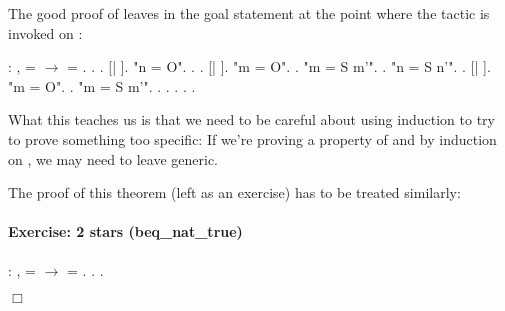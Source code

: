 \documentclass[12pt]{report}
\begin{document}
 The good proof of  leaves  in the goal
    statement at the point where the  tactic is invoked on
    : \begin{coqdoccode}
\coqdocemptyline
\coqdocnoindent
{}  : \coqdockw{\ensuremath{\forall}}  ,\coqdoceol
\coqdocindent{2.50em}
  =   \ensuremath{\rightarrow}\coqdoceol
\coqdocindent{2.50em}
 = .\coqdoceol
\coqdocnoindent
{}.\coqdoceol
\coqdocindent{1.00em}
 .    [| ].\coqdoceol
\coqdocindent{1.00em}
 "n = O". .   .    [| ].\coqdoceol
\coqdocindent{2.00em}
 "m = O". .\coqdoceol
\coqdocindent{2.00em}
 "m = S m'".  .\coqdoceol
\coqdocindent{1.00em}
 "n = S n'".\coqdoceol
\coqdocindent{2.00em}
  .\coqdoceol
\coqdocindent{2.00em}
   [| ].\coqdoceol
\coqdocindent{2.00em}
 "m = O".\coqdoceol
\coqdocindent{3.00em}
 .\coqdoceol
\coqdocindent{2.00em}
 "m = S m'".\coqdoceol
\coqdocindent{3.00em}
 .\coqdoceol
\coqdocindent{3.00em}
 .  . . .\coqdoceol
\coqdocemptyline
\end{coqdoccode}
What this teaches us is that we need to be careful about using
    induction to try to prove something too specific: If we're proving
    a property of  and  by induction on , we may need to
    leave  generic. 

 The proof of this theorem (left as an exercise) has to be treated similarly: 

\paragraph{Exercise: 2 stars (beq\_nat\_true)}

\begin{coqdoccode}
\coqdocnoindent
{}  : \coqdockw{\ensuremath{\forall}}  ,\coqdoceol
\coqdocindent{2.00em}
   =  \ensuremath{\rightarrow}  = .\coqdoceol
\coqdocnoindent
{}.\coqdoceol
 .\coqdoceol
\end{coqdoccode}
\ensuremath{\Box} 
\end{document}
